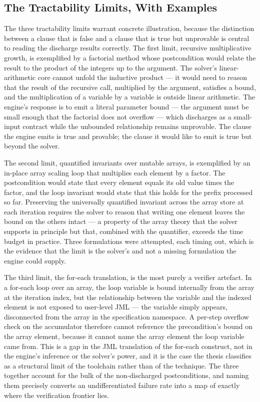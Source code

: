 \subsection{The Tractability Limits, With Examples}

The three tractability limits warrant concrete illustration, because the
distinction between a clause that is false and a clause that is true but
unprovable is central to reading the discharge results correctly. The first limit,
recursive multiplicative growth, is exemplified by a factorial method whose
postcondition would relate the result to the product of the integers up to the
argument. The solver's linear-arithmetic core cannot unfold the inductive product
--- it would need to reason that the result of the recursive call, multiplied by
the argument, satisfies a bound, and the multiplication of a variable by a
variable is outside linear arithmetic. The engine's response is to emit a literal
parameter bound --- the argument must be small enough that the factorial does not
overflow --- which discharges as a small-input contract while the unbounded
relationship remains unprovable. The clause the engine emits is true and provable;
the clause it would like to emit is true but beyond the solver.

The second limit, quantified invariants over mutable arrays, is exemplified by an
in-place array scaling loop that multiplies each element by a factor. The
postcondition would state that every element equals its old value times the
factor, and the loop invariant would state that this holds for the prefix
processed so far. Preserving the universally quantified invariant across the array
store at each iteration requires the solver to reason that writing one element
leaves the bound on the others intact --- a property of the array theory that the
solver supports in principle but that, combined with the quantifier, exceeds the
time budget in practice. Three formulations were attempted, each timing out, which
is the evidence that the limit is the solver's and not a missing formulation the
engine could supply.

The third limit, the for-each translation, is the most purely a verifier artefact.
In a for-each loop over an array, the loop variable is bound internally from the
array at the iteration index, but the relationship between the variable and the
indexed element is not exposed to user-level JML --- the variable simply appears,
disconnected from the array in the specification namespace. A per-step overflow
check on the accumulator therefore cannot reference the precondition's bound on
the array element, because it cannot name the array element the loop variable came
from. This is a gap in the JML translation of the for-each construct, not in the
engine's inference or the solver's power, and it is the case the thesis classifies
as a structural limit of the toolchain rather than of the technique. The three
together account for the bulk of the non-discharged postconditions, and naming
them precisely converts an undifferentiated failure rate into a map of exactly
where the verification frontier lies.

